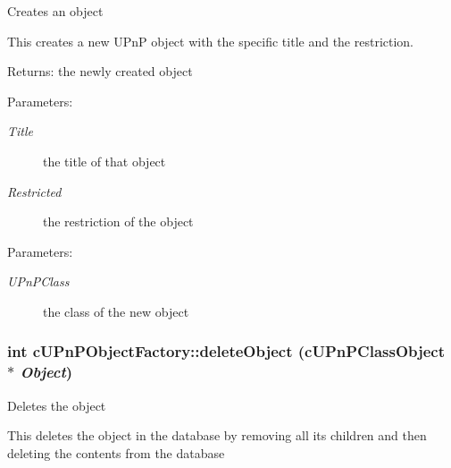 Creates an object

This creates a new UPnP object with the specific title and the restriction.

\begin{Desc}
\item[Returns:]the newly created object \end{Desc}
\begin{Desc}
\item[Parameters:]
\begin{description}
\item[{\em Title}]the title of that object \item[{\em Restricted}]the restriction of the object \end{description}
\end{Desc}


\begin{Desc}
\item[Parameters:]
\begin{description}
\item[{\em UPnPClass}]the class of the new object \end{description}
\end{Desc}
\hypertarget{classcUPnPObjectFactory_10198e67d9da1f964aa895cd463b2f92}{
\subsubsection[{deleteObject}]{\setlength{\rightskip}{0pt plus 5cm}int cUPnPObjectFactory::deleteObject ({\bf cUPnPClassObject} $\ast$ {\em Object})}}
\label{classcUPnPObjectFactory_10198e67d9da1f964aa895cd463b2f92}


Deletes the object

This deletes the object in the database by removing all its children and then deleting the contents from the database

